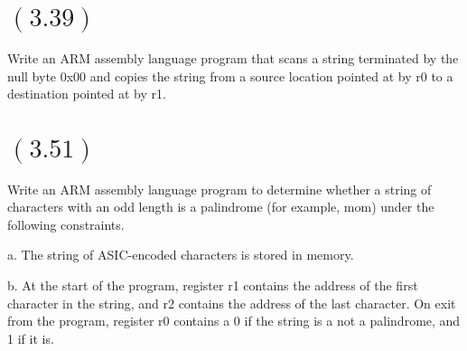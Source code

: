 \documentclass[letterpaper,12pt,titlepage]{article}
\begin{document}
\section*{$(3.39)$} Write an ARM assembly language program that scans a string terminated by the null byte 0x00 and copies the string from a source location pointed at by r0 to a destination pointed at by r1.

\section*{$(3.51)$} Write an ARM assembly language program to determine whether a string of characters with an odd length is a palindrome (for example, mom) under the following constraints.

a. The string of ASIC-encoded characters is stored in memory.

b. At the start of the program, register r1 contains the address of the first character in the string, and r2 contains the address of the last character. On exit from the program, register r0 contains a 0 if the string is a not a palindrome, and 1 if it is.



\end{document}
